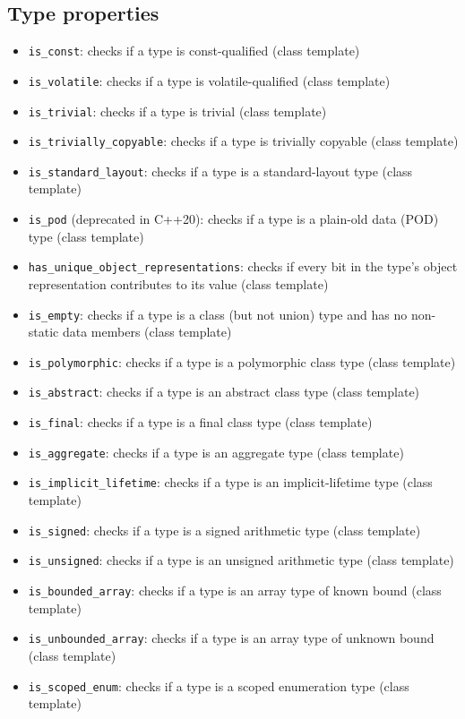 \documentclass{report}
\begin{document}
        \subsection{Type properties}
        \begin{itemize}
            \item \texttt{is\_const}: checks if a type is const-qualified (class template)
            \item \texttt{is\_volatile}: checks if a type is volatile-qualified (class template)
            \item \texttt{is\_trivial}: checks if a type is trivial (class template)
            \item \texttt{is\_trivially\_copyable}: checks if a type is trivially copyable (class template)
            \item \texttt{is\_standard\_layout}: checks if a type is a standard-layout type (class template)
            \item \texttt{is\_pod} (deprecated in C++20): checks if a type is a plain-old data (POD) type (class template)
            \item \texttt{has\_unique\_object\_representations}: checks if every bit in the type's object representation contributes to its value (class template)
            \item \texttt{is\_empty}: checks if a type is a class (but not union) type and has no non-static data members (class template)
            \item \texttt{is\_polymorphic}: checks if a type is a polymorphic class type (class template)
            \item \texttt{is\_abstract}: checks if a type is an abstract class type (class template)
            \item \texttt{is\_final}: checks if a type is a final class type (class template)
            \item \texttt{is\_aggregate}: checks if a type is an aggregate type (class template)
            \item \texttt{is\_implicit\_lifetime}: checks if a type is an implicit-lifetime type (class template)
            \item \texttt{is\_signed}: checks if a type is a signed arithmetic type (class template)
            \item \texttt{is\_unsigned}: checks if a type is an unsigned arithmetic type (class template)
            \item \texttt{is\_bounded\_array}: checks if a type is an array type of known bound (class template)
            \item \texttt{is\_unbounded\_array}: checks if a type is an array type of unknown bound (class template)
            \item \texttt{is\_scoped\_enum}: checks if a type is a scoped enumeration type (class template)
        \end{itemize}
\end{document}
